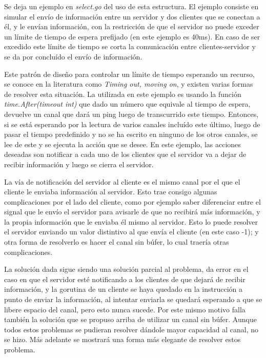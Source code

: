 \documentclass[10pt]{article} %
\begin{document}
Se deja un ejemplo en \textit{select.go} del uso de esta estructura. El ejemplo consiste en simular el envío de información entre un servidor y dos clientes que se conectan a él, y le envían información, con la restricción de que el servidor no puede exceder un límite de tiempo de espera prefijado (en este ejemplo es 40ms). En caso de ser excedido este límite de tiempo se corta la comunicación entre clientes-servidor y se da por concluído el envío de información. 

Este patrón de diseño para controlar un límite de tiempo esperando un recurso, se conoce en la literatura como \emph{Timing out, moving on}, y existen varias formas de resolver esta situación. La utilizada en este ejemplo es usando la función \emph{time.After(timeout int)} que dado un número que equivale al tiempo de espera, devuelve un canal que dará un ping luego de transcurrido este tiempo. Entonces, si se está esperando por la lectura de varios canales incluído este último, luego de pasar el tiempo predefinido y no se ha escrito en ninguno de los otros canales, se lee de este y se ejecuta la acción que se desee. En este ejemplo, las acciones deseadas son notificar a cada uno de los clientes que el servidor va a dejar de recibir información y luego se cierra el servidor. 

La vía de notificación del servidor al cliente es el mismo canal por el que el cliente le enviaba información al servidor. Esto trae consigo algunas complicaciones por el lado del cliente, como por ejemplo saber diferenciar entre el signal que le envío el servidor para avisarle de que no recibirá más información, y la propia información que le enviaba él mismo al servidor. Esto lo puede resolver el servidor enviando un valor distintivo al que envía el cliente (en este caso -1); y otra forma de resolverlo es hacer el canal sin búfer, lo cual traería otras complicaciones. 

La solución dada sigue siendo una solución parcial al problema, da error en el caso en que el servidor esté notificando a los clientes de que dejará de recibir información, y la gorutina de un cliente se haya quedado en la instrucción a punto de enviar la información, al intentar enviarla se quedará esperando a que se libere espacio del canal, pero esto nunca sucede. Por este mismo motivo falla también la solución que se propuso arriba de utilizar un canal sin búfer. Aunque todos estos problemas se pudieran resolver dándole mayor capacidad al canal, no se hizo. Más adelante se mostrará una forma más elegante de resolver estos problema.
\end{document}
